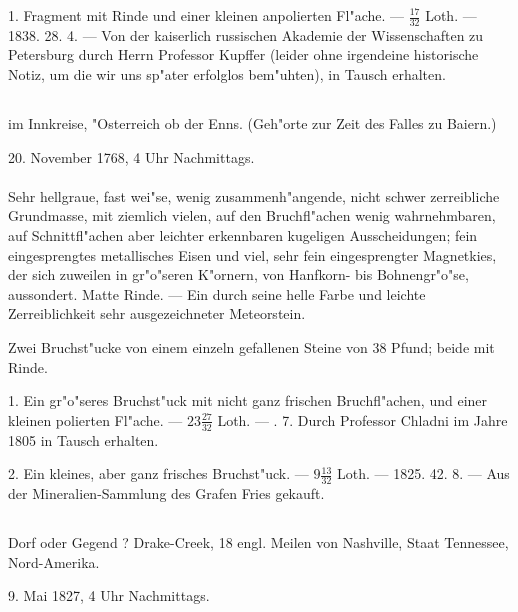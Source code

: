 \documentclass[a4paper, 11pt, oneside, polutonikogreek, german]{article}
\begin{document}
1. Fragment mit Rinde und einer kleinen anpolierten Fl"ache. --- $\frac{17}{32}$ Loth. --- 1838. 28. 4. --- Von der kaiserlich russischen Akademie der Wissenschaften zu Petersburg durch Herrn Professor Kupffer (leider ohne irgendeine historische Notiz, um die wir uns sp"ater erfolglos bem"uhten), in Tausch erhalten.
\subsection[\frakfamily{Mauerkirchen.}]{}
\begin{center}

im Innkreise, "Osterreich ob der Enns. (Geh"orte zur Zeit des Falles zu Baiern.)

20. November 1768, 4 Uhr Nachmittags.
\end{center}
\paragraph{}
Sehr hellgraue, fast wei"se, wenig zusammenh"angende, nicht schwer zerreibliche Grundmasse, mit ziemlich vielen, auf den Bruchfl"achen wenig wahrnehmbaren, auf Schnittfl"achen aber leichter erkennbaren kugeligen Ausscheidungen; fein eingesprengtes metallisches Eisen und viel, sehr fein eingesprengter Magnetkies, der sich zuweilen in gr"o"seren K"ornern, von Hanfkorn- bis Bohnengr"o"se, aussondert. Matte Rinde. --- Ein durch seine helle Farbe und leichte Zerreiblichkeit sehr ausgezeichneter Meteorstein.

Zwei Bruchst"ucke von einem einzeln gefallenen Steine von 38 Pfund; beide mit Rinde.

1. Ein gr"o"seres Bruchst"uck mit nicht ganz frischen Bruchfl"achen, und einer kleinen polierten Fl"ache. --- $23\frac{27}{32}$ Loth. --- . 7. Durch Professor Chladni im Jahre 1805 in Tausch erhalten.

2. Ein kleines, aber ganz frisches Bruchst"uck. --- $9\frac{13}{32}$ Loth. --- 1825. 42. 8. --- Aus der Mineralien-Sammlung des Grafen Fries gekauft.
\subsection{}
\begin{center}

Dorf oder Gegend ? Drake-Creek, 18 engl. Meilen von Nashville, Staat Tennessee, Nord-Amerika.

9. Mai 1827, 4 Uhr Nachmittags.
\end{center}
\end{document}
